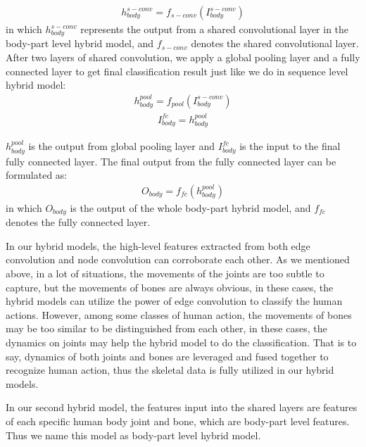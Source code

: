 \documentclass[a4paper,11pt]{article}
\begin{document}
\begin{align}
&h_{body}^{s-conv} = f_{s-conv}(I_{body}^{s-conv}) &
\end{align}
in which $h_{body}^{s-conv}$ represents the output from a shared convolutional layer in the body-part level hybrid model, and $f_{s-conv}$ denotes the shared convolutional layer.
After two layers of shared convolution, we apply a global pooling layer and a fully connected layer to get final classification result just like we do in sequence level hybrid model:
\begin{align}
&h_{body}^{pool} = f_{pool}(I_{body}^{s-conv}) &
\end{align}
\begin{align}
&I_{body}^{fc} = h_{body}^{pool} &
\end{align}

$h_{body}^{pool}$ is the output from global pooling layer and $I_{body}^{fc}$ is the input to the final fully connected layer. The final output from the fully connected layer can be formulated as:
\begin{align}
&O_{body} = f_{fc}(h_{body}^{pool}) &
\end{align}
in which $O_{body}$ is the output of the whole body-part hybrid model, and $f_{fc}$ denotes the fully connected layer.


In our hybrid models, the high-level features extracted from both edge convolution and node convolution can corroborate each other. As we mentioned above, in a lot of situations, the movements of the joints are too subtle to capture, but the movements of bones are always obvious, in these cases, the hybrid models can utilize the power of edge convolution to classify the human actions. However, among some classes of human action, the movements of bones may be too similar to be distinguished from each other, in these cases, the dynamics on joints may help the hybrid model to do the classification. That is to say, dynamics of both joints and bones are leveraged and fused together to recognize human action, thus the skeletal data is fully utilized in our hybrid models.

In our second hybrid model, the features input into the shared layers are features of each specific human body joint and bone, which are body-part level features. Thus we name this model as body-part level hybrid model.
\end{document}
